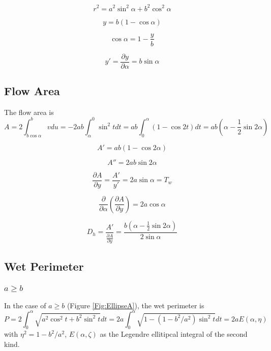 \begin{equation}
r^2 = a^2\sin^2\alpha + b^2\cos^2\alpha
\end{equation}

\begin{equation}
y = b(1 - \cos\alpha) 
\end{equation}

\begin{equation}
\cos\alpha =1 - \frac{y}{b}
\end{equation}

\begin{equation}
y' = \frac{\partial y}{\partial \alpha} = b \sin\alpha
\end{equation}

\subsection{Flow Area}
The flow area is
\begin{equation}
A = 2 \int_{b\cos\alpha }^b v du = -2ab\int^0_\alpha \sin^2tdt =  ab\int_0^\alpha (1 - \cos 2t) dt = ab(\alpha - \frac{1}{2}\sin 2 \alpha)
\end{equation}

\begin{equation}
A' = ab(1 - \cos2\alpha)
\end{equation}

\begin{equation}
A'' = 2ab\sin2\alpha
\end{equation}

\begin{equation}
\frac{\partial A}{\partial y} = \frac{A'}{y'} = 2a\sin\alpha = T_w
\end{equation}

\begin{equation}
\frac{\partial }{\partial \alpha}\left(\frac{\partial A}{\partial y}\right) = 2a\cos\alpha
\end{equation}

\begin{equation}
D_h = \frac{A'}{\frac{\partial A}{\partial y}} = \frac{b(\alpha - \frac{1}{2}\sin 2 \alpha)}{ 2\sin\alpha}
\end{equation}


\subsection{Wet Perimeter}
\subsubsection{$a \ge b$}
In the case of $a \ge b$ (Figure \ref{Fig:EllipseA}), the wet perimeter is
\begin{equation}
P =  2\int _0 ^{\alpha } \sqrt{a^2\cos^2t + b^2\sin^2t} dt =2 a\int _0 ^{\alpha } \sqrt{1 - \left(1 - b^2/a^2\right) \sin^2t} dt =  2aE(\alpha, \eta)
\end{equation}
with $\eta^2 = 1 - b^2/a^2$,  $E(\alpha, \zeta)$ as the Legendre ellitipcal integral of the second kind.

